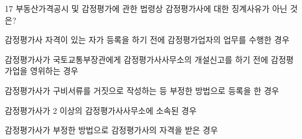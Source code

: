 \begin{question}{17}
부동산가격공시 및 감정평가에 관한 법령상 감정평가사에 대한 징계사유가 아닌 것은?
\begin{choices}
  \item 감정평가사 자격이 있는 자가 등록을 하기 전에 감정평가업자의 업무를 수행한 경우
  \item 감정평가사가 국토교통부장관에게 감정평가사사무소의 개설신고를 하기 전에 감정평가업을 영위하는 경우
  \item 감정평가사가 구비서류를 거짓으로 작성하는 등 부정한 방법으로 등록을 한 경우
  \item 감정평가사가 2 이상의 감정평가사사무소에 소속된 경우
  \item 감정평가사가 부정한 방법으로 감정평가사의 자격을 받은 경우
\end{choices}
\end{question}
